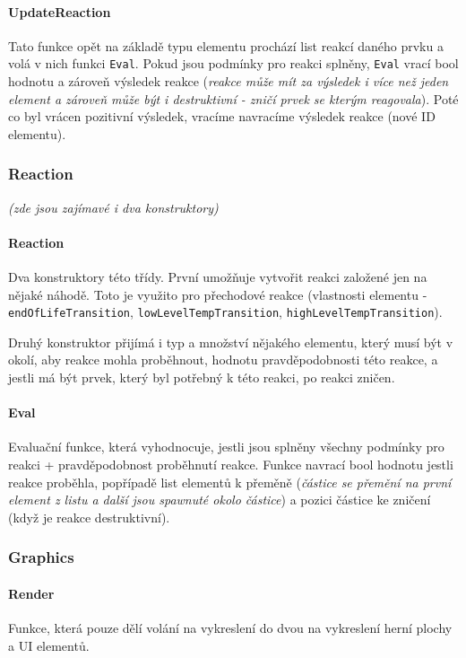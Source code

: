 \documentclass[a4paper, 12pt]{article}
\begin{document}
\paragraph{UpdateReaction}
Tato funkce opět na základě typu elementu prochází list reakcí daného prvku a
volá v nich funkci \texttt{Eval}. Pokud jsou podmínky pro reakci splněny,
\texttt{Eval} vrací bool hodnotu a zároveň výsledek reakce (\emph{reakce může mít za
výsledek i více než jeden element a zároveň může být i destruktivní - zničí
prvek se kterým reagovala}). Poté co byl vrácen pozitivní výsledek, vracíme
navracíme výsledek reakce (nové ID elementu).

\subsubsection{Reaction}
\emph{(zde jsou zajímavé i dva konstruktory)}
\paragraph{Reaction}
Dva konstruktory této třídy. První umožňuje vytvořit reakci založené jen na
nějaké náhodě. Toto je využito pro přechodové reakce (vlastnosti elementu -
\texttt{endOfLifeTransition}, \texttt{lowLevelTempTransition},
\texttt{highLevelTempTransition}).

Druhý konstruktor přijímá i typ a množství nějakého elementu, který musí být v
okolí, aby reakce mohla proběhnout, hodnotu pravděpodobnosti této reakce, a
jestli má být prvek, který byl potřebný k této reakci, po reakci zničen.

\paragraph{Eval}
Evaluační funkce, která vyhodnocuje, jestli jsou splněny všechny podmínky pro
reakci + pravděpodobnost proběhnutí reakce. Funkce navrací bool hodnotu jestli
reakce proběhla, popřípadě list elementů k přeměně (\emph{částice se přemění na první 
element z listu a další jsou spawnuté okolo částice}) a pozici částice ke
zničení (když je reakce destruktivní).

\subsubsection{Graphics}
\paragraph{Render}
Funkce, která pouze dělí volání na vykreslení do dvou na vykreslení herní
plochy a UI elementů.
\end{document}
